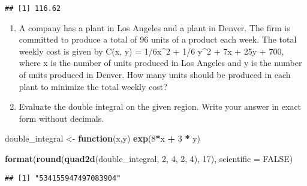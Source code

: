 \documentclass[
]{article}
\newenvironment{Shaded}{\begin{snugshade}}{\end{snugshade}}
\newcommand{\ControlFlowTok}[1]{\textcolor[rgb]{0.13,0.29,0.53}{\textbf{#1}}}
\newcommand{\DataTypeTok}[1]{\textcolor[rgb]{0.13,0.29,0.53}{#1}}
\newcommand{\DecValTok}[1]{\textcolor[rgb]{0.00,0.00,0.81}{#1}}
\newcommand{\KeywordTok}[1]{\textcolor[rgb]{0.13,0.29,0.53}{\textbf{#1}}}
\newcommand{\NormalTok}[1]{#1}
\newcommand{\OperatorTok}[1]{\textcolor[rgb]{0.81,0.36,0.00}{\textbf{#1}}}
\newcommand{\OtherTok}[1]{\textcolor[rgb]{0.56,0.35,0.01}{#1}}
\newcommand{\StringTok}[1]{\textcolor[rgb]{0.31,0.60,0.02}{#1}}
\begin{document}
\begin{verbatim}
## [1] 116.62
\end{verbatim}

\begin{enumerate}
\def\labelenumi{\arabic{enumi}.}
\setcounter{enumi}{3}
\item
  A company has a plant in Los Angeles and a plant in Denver. The firm
  is committed to produce a total of 96 units of a product each week.
  The total weekly cost is given by C(x, y) = 1/6x\^{}2 + 1/6 y\^{}2 +
  7x + 25y + 700, where x is the number of units produced in Los Angeles
  and y is the number of units produced in Denver. How many units should
  be produced in each plant to minimize the total weekly cost?
\item
  Evaluate the double integral on the given region. Write your answer in
  exact form without decimals.
\end{enumerate}

\begin{Shaded}
\begin{Highlighting}[]
\NormalTok{double_integral <-}\StringTok{ }\ControlFlowTok{function}\NormalTok{(x,y) }\KeywordTok{exp}\NormalTok{(}\DecValTok{8}\OperatorTok{*}\NormalTok{x }\OperatorTok{+}\StringTok{ }\DecValTok{3} \OperatorTok{*}\StringTok{ }\NormalTok{y)}

\KeywordTok{format}\NormalTok{(}\KeywordTok{round}\NormalTok{(}\KeywordTok{quad2d}\NormalTok{(double_integral, }\DecValTok{2}\NormalTok{, }\DecValTok{4}\NormalTok{, }\DecValTok{2}\NormalTok{, }\DecValTok{4}\NormalTok{), }\DecValTok{17}\NormalTok{), }\DataTypeTok{scientific =}  \OtherTok{FALSE}\NormalTok{)}
\end{Highlighting}
\end{Shaded}

\begin{verbatim}
## [1] "534155947497083904"
\end{verbatim}
\end{document}
